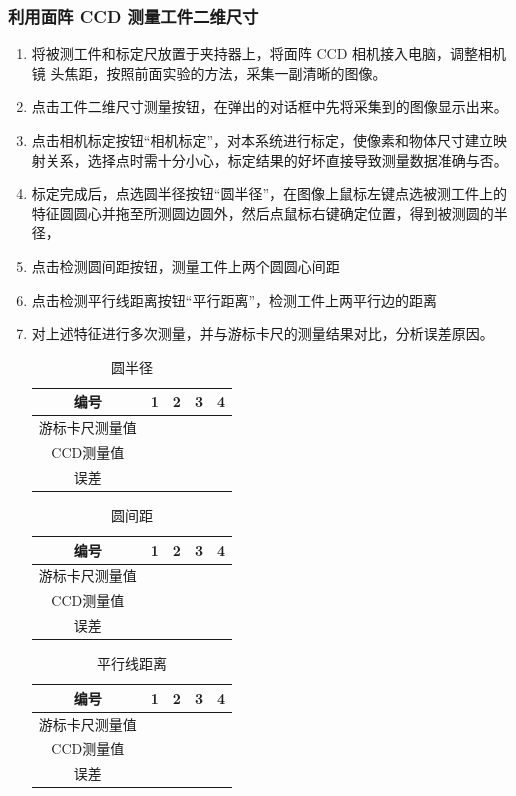 \documentclass{ctexart}
\begin{document}
	\subsubsection{利用面阵 CCD 测量工件二维尺寸}
	\begin{enumerate}
		\item 将被测工件和标定尺放置于夹持器上，将面阵 CCD 相机接入电脑，调整相机镜
		头焦距，按照前面实验的方法，采集一副清晰的图像。
		\item 点击工件二维尺寸测量按钮，在弹出的对话框中先将采集到的图像显示出来。
		\item 点击相机标定按钮“相机标定”，对本系统进行标定，使像素和物体尺寸建立映射关系，选择点时需十分小心，标定结果的好坏直接导致测量数据准确与否。
		\item 标定完成后，点选圆半径按钮“圆半径”，在图像上鼠标左键点选被测工件上的特征圆圆心并拖至所测圆边圆外，然后点鼠标右键确定位置，得到被测圆的半径，
		\item 点击检测圆间距按钮，测量工件上两个圆圆心间距
		\item 点击检测平行线距离按钮“平行距离”，检测工件上两平行边的距离
		\item 对上述特征进行多次测量，并与游标卡尺的测量结果对比，分析误差原因。
		\begin{table}[H]
			\caption{圆半径}
			\centering
			\begin{tabular}{| c | p{2cm} | p{2cm} | p{2cm} | p{2cm} |}
				\hline
				编号 & 1 & 2 & 3 & 4 \\
				\hline
				游标卡尺测量值 & & & & \\
				\hline
				CCD测量值 & & & & \\
				\hline
				误差 & & & & \\
				\hline
			\end{tabular}
		\end{table}
	\begin{table}[H]
		\caption{圆间距}
		\centering
		\begin{tabular}{| c | p{2cm} | p{2cm} | p{2cm} | p{2cm} |}
			\hline
			编号 & 1 & 2 & 3 & 4 \\
			\hline
			游标卡尺测量值 & & & & \\
			\hline
			CCD测量值 & & & & \\
			\hline
			误差 & & & & \\
			\hline
		\end{tabular}
	\end{table}
\begin{table}[H]
	\caption{平行线距离}
	\centering
	\begin{tabular}{| c | p{2cm} | p{2cm} | p{2cm} | p{2cm} |}
		\hline
		编号 & 1 & 2 & 3 & 4 \\
		\hline
		游标卡尺测量值 & & & & \\
		\hline
		CCD测量值 & & & & \\
		\hline
		误差 & & & & \\
		\hline
	\end{tabular}
\end{table}
	\end{enumerate}
        
\end{document}
